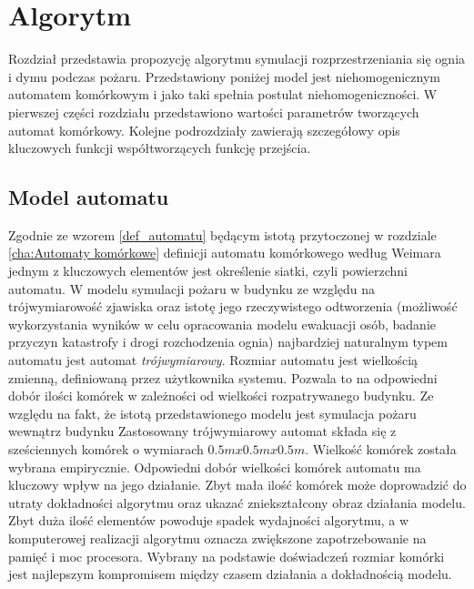 ﻿%
\chapter{Algorytm}
\label{cha:Algorytm}
Rozdział przedstawia propozycję algorytmu symulacji rozprzestrzeniania się ognia i dymu podczas pożaru.
Przedstawiony poniżej model jest niehomogenicznym automatem komórkowym i jako taki spełnia postulat niehomogeniczności.
W pierwszej części rozdziału przedstawiono wartości parametrów tworzących automat komórkowy. Kolejne podrozdziały 
zawierają szczegółowy opis kluczowych funkcji współtworzących funkcję przejścia.
\section {Model automatu}
Zgodnie ze wzorem \ref{def_automatu} będącym istotą przytoczonej w rozdziale \ref{cha:Automaty komórkowe} definicji automatu komórkowego według Weimara jednym z kluczowych elementów jest określenie siatki, czyli powierzchni automatu. W modelu symulacji pożaru w budynku
ze względu na trójwymiarowość zjawiska oraz istotę jego rzeczywistego odtworzenia (możliwość wykorzystania wyników w celu
opracowania modelu ewakuacji osób, badanie przyczyn katastrofy i drogi rozchodzenia ognia) najbardziej naturalnym typem automatu 
jest automat \textsl {trójwymiarowy}. 
Rozmiar automatu jest wielkością zmienną, definiowaną przez użytkownika systemu. Pozwala to na odpowiedni dobór ilości komórek w zależności od wielkości rozpatrywanego budynku. Ze względu na fakt, że istotą przedstawionego modelu jest symulacja pożaru wewnątrz budynku 
Zastosowany trójwymiarowy automat składa się z sześciennych komórek o wymiarach $0.5m x 0.5m x 0.5m$. Wielkość komórek została wybrana empirycznie. 
Odpowiedni dobór wielkości komórek automatu ma kluczowy wpływ na jego działanie. Zbyt mała ilość komórek może doprowadzić do utraty
dokładności algorytmu oraz ukazać zniekształcony obraz działania modelu. Zbyt duża ilość elementów powoduje spadek wydajności algorytmu, a w komputerowej realizacji algorytmu oznacza zwiększone zapotrzebowanie na pamięć i moc procesora.
Wybrany na podstawie doświadczeń rozmiar komórki jest najlepszym
kompromisem między czasem działania a dokładnością modelu.
